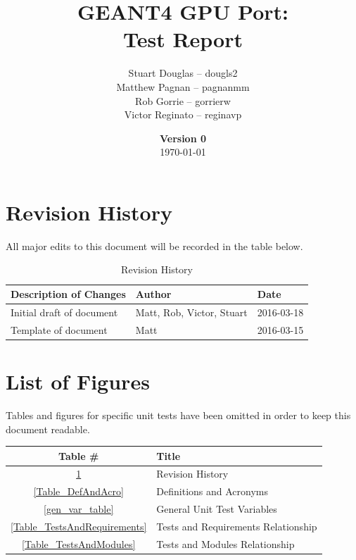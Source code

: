 \documentclass[12pt]{article}
\title{
\LARGE GEANT4 GPU Port:
\\\vspace{10mm}
\large \textbf{Test Report}
\vspace{40mm}
}
\author{
Stuart Douglas -- dougls2
\\Matthew Pagnan -- pagnanmm
\\Rob Gorrie -- gorrierw
\\Victor Reginato -- reginavp
\vspace{10mm}
}
\date{\vfill \textbf{Version 0}\\ \today}
\begin{document}

\maketitle
\newpage

\tableofcontents
\newpage
{}
\restoregeometry

\section*{Revision History}
All major edits to this document will be recorded in the table below.

\begin{table}[h]
\centering
\caption{Revision History}\label{Table_Revision}
\begin{tabular}{lll}
\toprule
\bf Description of Changes & \bf Author & \bf Date\\\midrule
Initial draft of document & Matt, Rob, Victor, Stuart & 2016-03-18\\
Template of document & Matt  & 2016-03-15\\
\bottomrule
\end{tabular}
\end{table}

\section*{List of Figures}
Tables and figures for specific unit tests have been omitted in order to keep this document readable.
\begin{center}
\begin{tabular}{cl}
\toprule
\bf Table \# & \bf Title\\\midrule
\ref{Table_Revision} 			& Revision History\\
\ref{Table_DefAndAcro} 			& Definitions and Acronyms\\
\ref{gen_var_table}			& General Unit Test Variables\\
\ref{Table_TestsAndRequirements}	& Tests and Requirements Relationship\\
\ref{Table_TestsAndModules}		& Tests and Modules Relationship\\
\bottomrule
\end{tabular}
\end{center}
\end{document}
